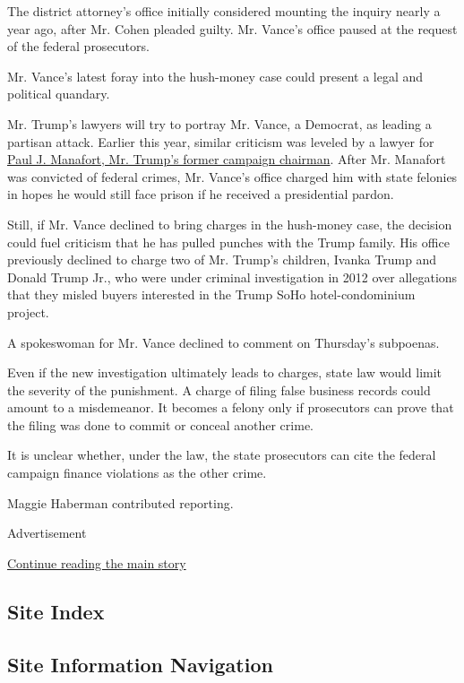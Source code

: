 The district attorney's office initially considered mounting the inquiry
nearly a year ago, after Mr. Cohen pleaded guilty. Mr. Vance's office
paused at the request of the federal prosecutors.

Mr. Vance's latest foray into the hush-money case could present a legal
and political quandary.

Mr. Trump's lawyers will try to portray Mr. Vance, a Democrat, as
leading a partisan attack. Earlier this year, similar criticism was
leveled by a lawyer for
\href{https://www.nytimes3xbfgragh.onion/2019/03/13/us/politics/paul-manafort-sentencing.html}{Paul
J. Manafort, Mr. Trump's former campaign chairman}. After Mr. Manafort
was convicted of federal crimes, Mr. Vance's office charged him with
state felonies in hopes he would still face prison if he received a
presidential pardon.

Still, if Mr. Vance declined to bring charges in the hush-money case,
the decision could fuel criticism that he has pulled punches with the
Trump family. His office previously declined to charge two of Mr.
Trump's children, Ivanka Trump and Donald Trump Jr., who were under
criminal investigation in 2012 over allegations that they misled buyers
interested in the Trump SoHo hotel-condominium project.

A spokeswoman for Mr. Vance declined to comment on Thursday's subpoenas.

Even if the new investigation ultimately leads to charges, state law
would limit the severity of the punishment. A charge of filing false
business records could amount to a misdemeanor. It becomes a felony only
if prosecutors can prove that the filing was done to commit or conceal
another crime.

It is unclear whether, under the law, the state prosecutors can cite the
federal campaign finance violations as the other crime.

Maggie Haberman contributed reporting.

Advertisement

\protect\hyperlink{after-bottom}{Continue reading the main story}

\hypertarget{site-index}{%
\subsection{Site Index}\label{site-index}}

\hypertarget{site-information-navigation}{%
\subsection{Site Information
Navigation}\label{site-information-navigation}}

